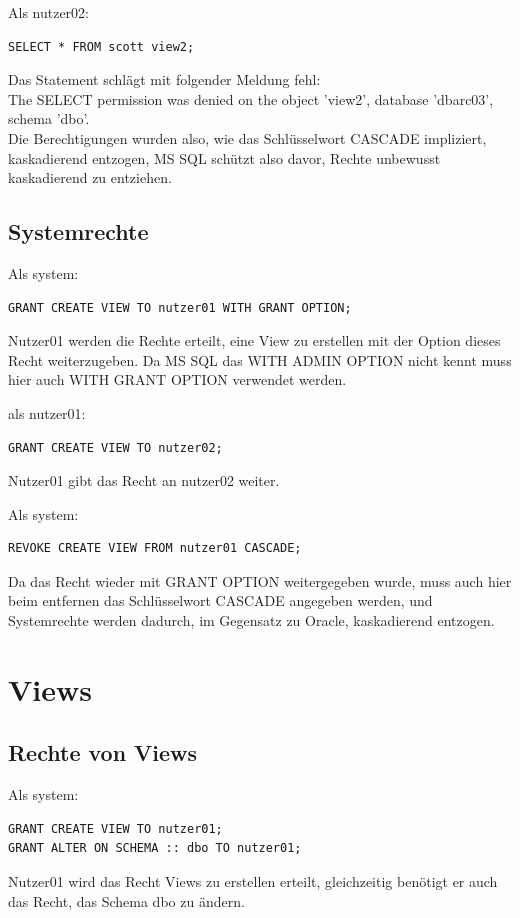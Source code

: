 \documentclass[10pt]{scrreprt}
\begin{document}
Als nutzer02:
\begin{lstlisting}[style=sql]
SELECT * FROM scott view2;
\end{lstlisting}
Das Statement schlägt mit folgender Meldung fehl:\\
The SELECT permission was denied on the object 'view2', database 'dbarc03', schema 'dbo'.\\
Die Berechtigungen wurden also, wie das Schlüsselwort CASCADE impliziert, kaskadierend entzogen, MS SQL schützt also davor, Rechte unbewusst kaskadierend zu entziehen.

\subsection{Systemrechte}
Als system:
\begin{lstlisting}[style=sql]
GRANT CREATE VIEW TO nutzer01 WITH GRANT OPTION;
\end{lstlisting}
Nutzer01 werden die Rechte erteilt, eine View zu erstellen mit der Option dieses Recht weiterzugeben. Da MS SQL das WITH ADMIN OPTION nicht kennt muss hier auch WITH GRANT OPTION verwendet werden.

als nutzer01:
\begin{lstlisting}[style=sql]
GRANT CREATE VIEW TO nutzer02;
\end{lstlisting}
Nutzer01 gibt das Recht an nutzer02 weiter.

Als system:
\begin{lstlisting}[style=sql]
REVOKE CREATE VIEW FROM nutzer01 CASCADE;
\end{lstlisting}
Da das Recht wieder mit GRANT OPTION weitergegeben wurde, muss auch hier beim entfernen das Schlüsselwort CASCADE angegeben werden, und Systemrechte werden dadurch, im Gegensatz zu Oracle, kaskadierend entzogen.

\section{Views}
\subsection{Rechte von Views}
Als system:
\begin{lstlisting}[style=sql]
GRANT CREATE VIEW TO nutzer01;
GRANT ALTER ON SCHEMA :: dbo TO nutzer01;
\end{lstlisting}
Nutzer01 wird das Recht Views zu erstellen erteilt, gleichzeitig benötigt er auch das Recht, das Schema dbo zu ändern.
\end{document}
